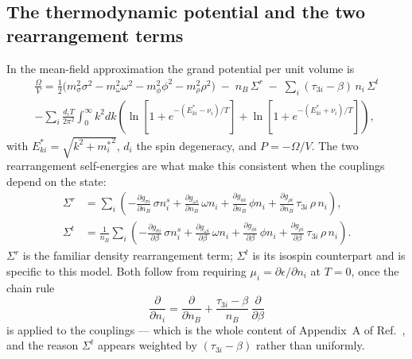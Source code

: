 \documentclass[aps,prc,onecolumn,superscriptaddress,nofootinbib,10pt]{revtex4-2}
\newcommand{\nB}{n_B}
\newcommand{\Sigmar}{\Sigma^{r}}
\newcommand{\Sigmat}{\Sigma^{t}}
\newcommand{\meff}[1]{m^{*}_{#1}}
\begin{document}
\subsection{The thermodynamic potential and the two rearrangement terms}

In the mean-field approximation the grand potential per unit volume
is~\cite{Frohaug2025}
\begin{equation}
\begin{split}
  \frac{\Omega}{V} = \tfrac{1}{2}\big(m_\sigma^2\sigma^2 - m_\omega^2\omega^2
                     - m_\phi^2\phi^2 - m_\rho^2\rho^2\big)
                   \; - \; \nB\, \Sigmar
                   \; - \; \sum_i (\tau_{3i} - \beta)\, n_i\, \Sigmat \\
   - \sum_i \frac{d_i T}{2\pi^2} \int_0^\infty \! k^2 dk
     \left( \ln\!\left[1 + e^{-(E^*_{ki} - \nu_i)/T}\right]
          + \ln\!\left[1 + e^{-(E^*_{ki} + \nu_i)/T}\right] \right) ,
\end{split}
\label{eq:omega}
\end{equation}
with $E^*_{ki} = \sqrt{k^2 + {\meff{i}}^2}$, $d_i$ the spin degeneracy, and
$P = -\Omega/V$. The two rearrangement self-energies are what make this
consistent when the couplings depend on the state:
\begin{align}
  \Sigmar &= \sum_i \left( -\frac{\partial g_{\sigma i}}{\partial \nB}\,
              \sigma n^s_i
            + \frac{\partial g_{\omega i}}{\partial \nB}\, \omega n_i
            + \frac{\partial g_{\phi i}}{\partial \nB}\, \phi n_i
            + \frac{\partial g_{\rho i}}{\partial \nB}\,
              \tau_{3i}\, \rho\, n_i \right) ,
  \label{eq:sigmar} \\[2pt]
  \Sigmat &= \frac{1}{\nB}\sum_i
            \left( -\frac{\partial g_{\sigma i}}{\partial \beta}\,
              \sigma n^s_i
            + \frac{\partial g_{\omega i}}{\partial \beta}\, \omega n_i
            + \frac{\partial g_{\phi i}}{\partial \beta}\, \phi n_i
            + \frac{\partial g_{\rho i}}{\partial \beta}\,
              \tau_{3i}\, \rho\, n_i \right) .
  \label{eq:sigmat}
\end{align}
$\Sigmar$ is the familiar density rearrangement term; $\Sigmat$ is its isospin
counterpart and is specific to this model. Both follow from requiring
$\mu_i = \partial\epsilon/\partial n_i$ at $T = 0$, once the chain rule
\begin{equation}
  \frac{\partial}{\partial n_i}
    = \frac{\partial}{\partial \nB}
    + \frac{\tau_{3i} - \beta}{\nB}\,\frac{\partial}{\partial \beta}
  \label{eq:chainrule}
\end{equation}
is applied to the couplings --- which is the whole content of Appendix~A of
Ref.~\cite{Frohaug2025}, and the reason $\Sigmat$ appears weighted by
$(\tau_{3i} - \beta)$ rather than uniformly.
\end{document}
